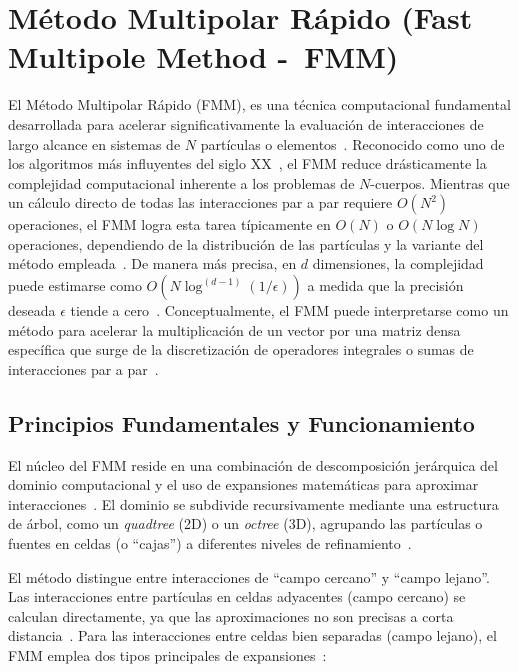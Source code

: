 \usetikzlibrary{positioning,arrows,shapes}
\section[Método Multipolar Rápido]{Método Multipolar Rápido (Fast Multipole Method -\ FMM)}\label{subsec:fmm}

El Método Multipolar Rápido (FMM), es una técnica computacional fundamental desarrollada para acelerar significativamente la evaluación de interacciones de largo alcance en sistemas de $N$ partículas o elementos~\cite{GreengardRokhlin1987, Martinsson2012}. Reconocido como uno de los algoritmos más influyentes del siglo XX~\cite{Cipra2000}, el FMM reduce drásticamente la complejidad computacional inherente a los problemas de $N$-cuerpos. Mientras que un cálculo directo de todas las interacciones par a par requiere $O(N^2)$ operaciones, el FMM logra esta tarea típicamente en $O(N)$ o $O(N \log N)$ operaciones, dependiendo de la distribución de las partículas y la variante del método empleada~\cite{BeatsonGreengard1997, GreengardRokhlin1987}. De manera más precisa, en $d$ dimensiones, la complejidad puede estimarse como $O(N \log^{(d-1)}(1/\epsilon))$ a medida que la precisión deseada $\epsilon$ tiende a cero~\cite{Martinsson2012}. Conceptualmente, el FMM puede interpretarse como un método para acelerar la multiplicación de un vector por una matriz densa específica que surge de la discretización de operadores integrales o sumas de interacciones par a par~\cite{ChenSF, Martinsson2012}.

\subsection{Principios Fundamentales y Funcionamiento}

El núcleo del FMM reside en una combinación de descomposición jerárquica del dominio computacional y el uso de expansiones matemáticas para aproximar interacciones~\cite{GreengardRokhlin1987}. El dominio se subdivide recursivamente mediante una estructura de árbol, como un \textit{quadtree} (2D) o un \textit{octree} (3D), agrupando las partículas o fuentes en celdas (o ``cajas'') a diferentes niveles de refinamiento~\cite{BeatsonGreengard1997, Martinsson2012}.

El método distingue entre interacciones de ``campo cercano'' y ``campo lejano''. Las interacciones entre partículas en celdas adyacentes (campo cercano) se calculan directamente, ya que las aproximaciones no son precisas a corta distancia~\cite{ChenSF, Ying2012}. Para las interacciones entre celdas bien separadas (campo lejano), el FMM emplea dos tipos principales de expansiones~\cite{GreengardRokhlin1987, Martinsson2012}:


